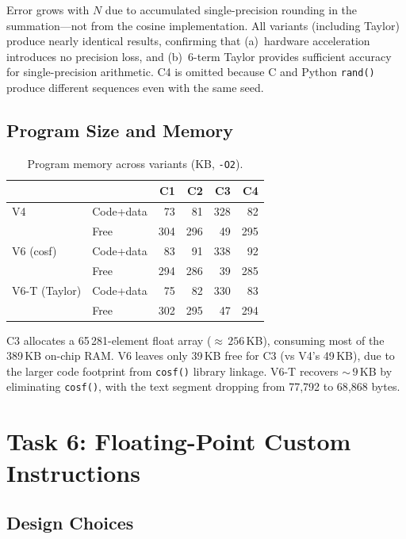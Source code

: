 \documentclass[a4paper,10pt,twocolumn]{article}
\begin{document}
Error grows with $N$ due to accumulated single-precision rounding in the summation---not from the cosine implementation.
All variants (including Taylor) produce nearly identical results, confirming that (a)~hardware acceleration introduces no precision loss, and (b)~6-term Taylor provides sufficient accuracy for single-precision arithmetic.
C4 is omitted because C and Python \texttt{rand()} produce different sequences even with the same seed.

\subsection{Program Size and Memory}
\begin{table}[H]
\centering
\caption{Program memory across variants (KB, \texttt{-O2}).}
\label{tab:memory}
\small
\begin{tabular}{llrrrr}
\toprule
 & & C1 & C2 & C3 & C4 \\
\midrule
V4        & Code+data & 73  & 81  & 328 & 82  \\
          & Free      & 304 & 296 & 49  & 295 \\
\midrule
V6 (cosf) & Code+data & 83  & 91  & 338 & 92  \\
          & Free      & 294 & 286 & 39  & 285  \\
\midrule
V6-T (Taylor) & Code+data & 75  & 82 & 330 & 83  \\
              & Free      & 302 & 295 & 47 & 294  \\
\bottomrule
\end{tabular}
\end{table}
C3 allocates a 65\,281-element float array (${\approx}\,256$\,KB), consuming most of the 389\,KB on-chip RAM. V6 leaves only 39\,KB free for C3 (vs V4's 49\,KB), due to the larger code footprint from \texttt{cosf()} library linkage. V6-T recovers ${\sim}\,9$\,KB by eliminating \texttt{cosf()}, with the text segment dropping from 77{,}792 to 68{,}868 bytes.
\section{Task 6: Floating-Point Custom Instructions}

\subsection{Design Choices}
\end{document}
